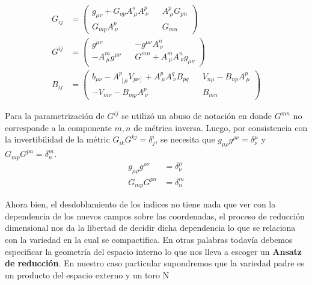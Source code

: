 \documentclass{article}
\numberwithin{equation}{section}
\begin{document}
\begin{subequations}
\begin{align}
\label{Gdown}
G_{i j}&= 
\begin{pmatrix}
g_{\mu \nu} + G_{o p} A^o_{\ \mu} A^p_{\ \nu} && A^p_{\ \mu} G_{p n}\\
G_{m p} A^p_{\ \nu}  && G_{m n}
\end{pmatrix}\\
\label{Gup}
G^{i j} &=
\begin{pmatrix}
g^{\mu \nu}  &&  - g^{\mu \nu} A^n_{\ \nu} \\
- A^m_{\ \mu} g^{\mu \nu}  && G^{m n} + A^m_{\ \mu} A^n_{\ \nu} g_{\mu \nu}
\end{pmatrix}\\
\label{B}
B_{i j} &=
\begin{pmatrix}
b_{\mu \nu} - A^p_{\ \left[\mu \right.} V_{\left. p \nu \right]} + A^p_{\ \mu}A^q_{\ \nu} B_{p q} && V_{n \mu} - B_{n p} A^p_{\ \mu}\\
-V_{m \nu} - B_{m p} A^p_{\ \nu}  && B_{m n}
\end{pmatrix}
\end{align}
\end{subequations}

Para la parametrización de $ G^{i j} $ se utilizó un abuso de notación en donde $ G^{m n} $ no corresponde a la componente $ m, n $ de métrica inversa. Luego, por consistencia con la invertibilidad de la métric $ G_{i k} G^{k j} = \delta^i_j $, se necesita que $ g_{\mu \rho} g^{\rho \nu} = \delta^{\mu}_{\nu} $ y $ G_{m p} G^{p n} = \delta^m_n $.\\

\begin{equation}\label{inversas}
\begin{aligned}
g_{\mu \rho} g^{\rho \nu} &= \delta^{\mu}_{\nu}\\
G_{m p} G^{p n} &= \delta^m_n
\end{aligned}
\end{equation}

Ahora bien, el desdoblamiento de los indices no tiene nada que ver con la dependencia de los nuevos campos sobre las coordenadas, el proceso de reducción dimensional nos da la libertad de decidir dicha dependencia lo que se relaciona con la variedad en la cual se compactifica. En otras palabras todavía debemos especificar la geometría del espacio interno lo que nos lleva a escoger un \textbf{Ansatz de reducción}. En nuestro caso particular supondremos que la variedad padre es un producto del espacio externo y un toro N
\end{document}
